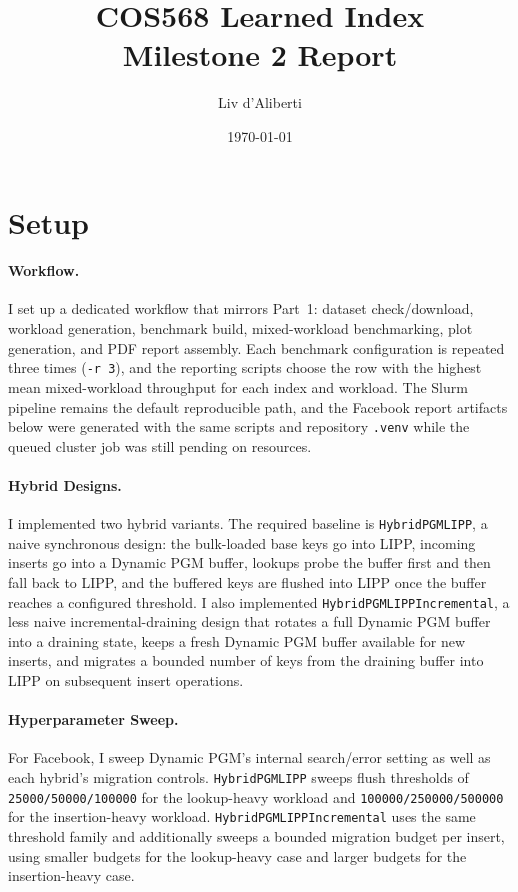 \documentclass[10pt]{article}
\title{COS568 Learned Index\\Milestone 2 Report}
\author{Liv d'Aliberti}
\date{\today}
\begin{document}
\maketitle
\thispagestyle{empty}

\section*{Setup}

\paragraph{Workflow.}
I set up a dedicated workflow that mirrors Part~1: dataset check/download, workload generation, benchmark build, mixed-workload benchmarking, plot generation, and PDF report assembly. Each benchmark configuration is repeated three times (\texttt{-r 3}), and the reporting scripts choose the row with the highest mean mixed-workload throughput for each index and workload. The Slurm pipeline remains the default reproducible path, and the Facebook report artifacts below were generated with the same scripts and repository \texttt{.venv} while the queued cluster job was still pending on resources.

\paragraph{Hybrid Designs.}
I implemented two hybrid variants. The required baseline is \texttt{HybridPGMLIPP}, a naive synchronous design: the bulk-loaded base keys go into LIPP, incoming inserts go into a Dynamic PGM buffer, lookups probe the buffer first and then fall back to LIPP, and the buffered keys are flushed into LIPP once the buffer reaches a configured threshold. I also implemented \texttt{HybridPGMLIPPIncremental}, a less naive incremental-draining design that rotates a full Dynamic PGM buffer into a draining state, keeps a fresh Dynamic PGM buffer available for new inserts, and migrates a bounded number of keys from the draining buffer into LIPP on subsequent insert operations.

\paragraph{Hyperparameter Sweep.}
For Facebook, I sweep Dynamic PGM's internal search/error setting as well as each hybrid's migration controls. \texttt{HybridPGMLIPP} sweeps flush thresholds of \texttt{25000/50000/100000} for the lookup-heavy workload and \texttt{100000/250000/500000} for the insertion-heavy workload. \texttt{HybridPGMLIPPIncremental} uses the same threshold family and additionally sweeps a bounded migration budget per insert, using smaller budgets for the lookup-heavy case and larger budgets for the insertion-heavy case.
\end{document}

